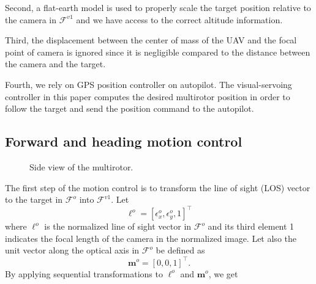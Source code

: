 Second, a flat-earth model is used to properly scale the target position relative to the camera in $\mathcal{F}^{v1}$ and we have access to the correct altitude information. 

Third, the displacement between the center of mass of the UAV and the focal point of camera is ignored since it is negligible compared to the distance between the camera and the target. 

Fourth, we rely on GPS position controller on autopilot. The visual-servoing controller in this paper computes the desired multirotor position in order to follow the target and send the position command to the autopilot.

\subsection{Forward and heading motion control}
\begin{figure}[thpb]
	\centering
	\caption{Side view of the multirotor.}
	\label{side_view}
\end{figure}
The first step of the motion control is to transform the line of sight (LOS) vector to the target in $\mathcal{F}^o$ into $\mathcal{F}^{v1}$. Let 
\begin{equation}
\mathbf{\ell}^o=[\epsilon_x^o, \epsilon_y^o, 1]^\top
\end{equation} where $\ell^o$ is the normalized line of sight vector in $\mathcal{F}^o$ and its third element 1 indicates the focal length of the camera in the normalized image. Let also the unit vector along the optical axis in $\mathcal{F}^o$ be defined as 
\begin{equation}
\mathbf{m}^o=[0, 0, 1]^\top.
\end{equation}
By applying sequential transformations to $\ell^o$ and $\mathbf{m}^o$, we get
